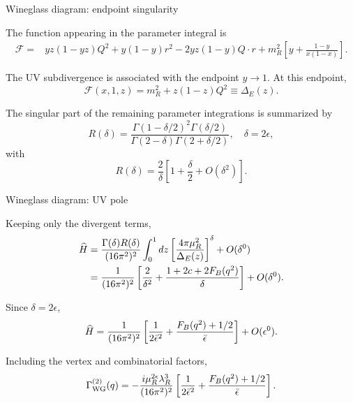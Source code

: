 \documentclass[aspectratio=169,10pt]{beamer}
\begin{document}
\begin{frame}{Wineglass diagram: endpoint singularity}

The function appearing in the parameter integral is
\begin{align}
\mathcal F
={}&
yz(1-yz)Q^2
+
y(1-y)r^2 -
2yz(1-y)Q\cdot r
+
m_R^2
\left[
y+\frac{1-y}{x(1-x)}
\right].
\end{align}

The UV subdivergence is associated with the endpoint $y\rightarrow1$. At this endpoint,
\begin{equation}
\mathcal F(x,1,z)
=
m_R^2+z(1-z)Q^2
\equiv
\Delta_E(z).
\end{equation}

The singular part of the remaining parameter integrations is
summarized by
\begin{equation}
R(\delta)
=
\frac{
\Gamma(1-\delta/2)^2
\Gamma(\delta/2)
}{
\Gamma(2-\delta)
\Gamma(2+\delta/2)
},
\quad
\delta=2\epsilon,
\end{equation}
with
\begin{equation}
R(\delta)
=
\frac2\delta
\left[
1+\frac{\delta}{2}
+O(\delta^2)
\right].
\end{equation}

\end{frame}


\begin{frame}{Wineglass diagram: UV pole}

Keeping only the divergent terms,
\begin{align}
\widehat H
&=
\frac{\Gamma(\delta)R(\delta)}
{(16\pi^2)^2}
\int_0^1dz
\left[
\frac{4\pi\mu_R^2}
{\Delta_E(z)}
\right]^\delta
+
O(\delta^0)
\\
&=
\frac1{(16\pi^2)^2}
\left[
\frac2{\delta^2}
+
\frac{
1+2c+2F_B(q^2)
}{\delta}
\right]
+
O(\delta^0).
\end{align}

Since $\delta=2\epsilon$,
\begin{equation}
\widehat H
=
\frac1{(16\pi^2)^2}
\left[
\frac1{2\bar\epsilon^2}
+
\frac{
F_B(q^2)+1/2
}{
\bar\epsilon
}
\right]
+
O(\epsilon^0).
\end{equation}

Including the vertex and combinatorial factors,
\begin{equation}
\Gamma_{\mathrm{WG}}^{(2)}(q)
=
-\frac{
i\mu_R^{2\epsilon}\lambda_R^3
}{
(16\pi^2)^2
}
\left[
\frac1{2\bar\epsilon^2}
+
\frac{
F_B(q^2)+1/2
}{
\bar\epsilon
}
\right].
\end{equation}


\end{frame}
\end{document}
